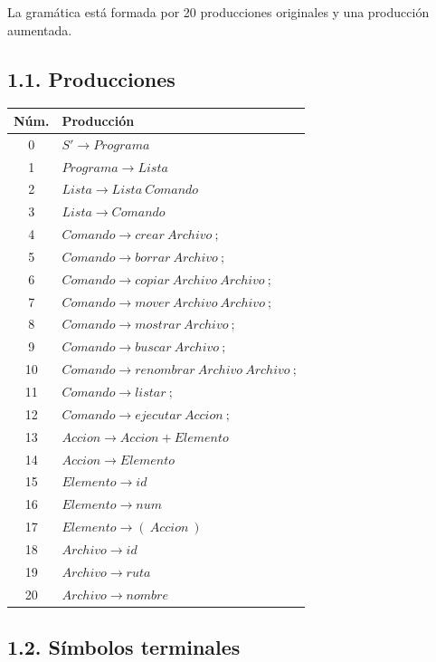 \documentclass[11pt,letterpaper]{article}
\begin{document}
La gramática está formada por 20 producciones originales
y una producción aumentada.

\subsection*{1.1. Producciones}

\begin{longtable}{|c|l|}
\hline
\textbf{Núm.} & \textbf{Producción} \\ \hline
0 & $S' \rightarrow Programa$ \\ \hline
1 & $Programa \rightarrow Lista$ \\ \hline
2 & $Lista \rightarrow Lista\ Comando$ \\ \hline
3 & $Lista \rightarrow Comando$ \\ \hline
4 & $Comando \rightarrow crear\ Archivo\ ;$ \\ \hline
5 & $Comando \rightarrow borrar\ Archivo\ ;$ \\ \hline
6 & $Comando \rightarrow copiar\ Archivo\ Archivo\ ;$ \\ \hline
7 & $Comando \rightarrow mover\ Archivo\ Archivo\ ;$ \\ \hline
8 & $Comando \rightarrow mostrar\ Archivo\ ;$ \\ \hline
9 & $Comando \rightarrow buscar\ Archivo\ ;$ \\ \hline
10 & $Comando \rightarrow renombrar\ Archivo\ Archivo\ ;$ \\ \hline
11 & $Comando \rightarrow listar\ ;$ \\ \hline
12 & $Comando \rightarrow ejecutar\ Accion\ ;$ \\ \hline
13 & $Accion \rightarrow Accion + Elemento$ \\ \hline
14 & $Accion \rightarrow Elemento$ \\ \hline
15 & $Elemento \rightarrow id$ \\ \hline
16 & $Elemento \rightarrow num$ \\ \hline
17 & $Elemento \rightarrow (\ Accion\ )$ \\ \hline
18 & $Archivo \rightarrow id$ \\ \hline
19 & $Archivo \rightarrow ruta$ \\ \hline
20 & $Archivo \rightarrow nombre$ \\ \hline
\end{longtable}

\subsection*{1.2. Símbolos terminales}
\end{document}
